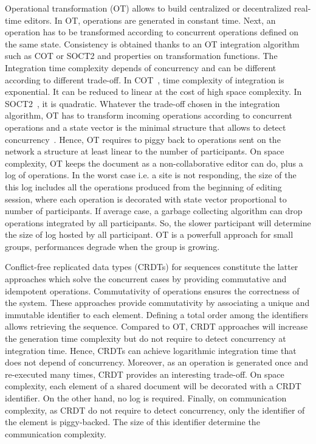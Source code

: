 \begin{asparadesc}
\item [Operational transformation (OT)] allows to build centralized or
  decentralized real-time editors. In OT, operations are generated in
  constant time. Next, an operation has to be transformed according to
  concurrent operations defined on the same state. Consistency is
  obtained thanks to an OT integration algorithm such as COT or SOCT2
  and properties on transformation functions. The Integration time
  complexity depends of concurrency and can be different according to
  different trade-off. In COT~\cite{sun2009contextbased}, time
  complexity of integration is exponential. It can be reduced to
  linear at the cost of high space complexity. In
  SOCT2~\cite{vidot2000copies}, it is quadratic. Whatever the trade-off chosen
  in the integration algorithm, OT has to transform incoming
  operations according to concurrent operations and a state vector is
  the minimal structure that allows to detect
  concurrency~\cite{charronbost1991concerning}. Hence, OT requires to
  piggy back to operations sent on the network a structure at least
  linear to the number of participants. On space complexity, OT keeps
  the document as a non-collaborative editor can do, plus a log of
  operations. In the worst case i.e. a site is not responding, the
  size of the this log includes all the operations produced from the
  beginning of editing session, where each operation is decorated with
  state vector proportional to number of participants. If average
  case, a garbage collecting algorithm can drop operations integrated
  by all participants. So, the slower participant will determine the
  size of log hosted by all participant. OT is a powerfull approach
  for small groups, performances degrade when the group is growing.

\item [Conflict-free replicated data types] (CRDTs) for sequences
  constitute the latter approaches which solve the concurrent cases by
  providing commutative and idempotent operations. Commutativity of
  operations ensures the correctness of the system. These approaches
  provide commutativity by associating a unique and immutable
  identifier to each element. Defining a total order among the
  identifiers allows retrieving the sequence. Compared to OT, CRDT
  approaches will increase the generation time complexity but do not
  require to detect concurrency at integration time. Hence, CRDTs can
  achieve logarithmic integration time that does not depend of
  concurrency. Moreover, as an operation is generated once and
  re-executed many times, CRDT provides an interesting trade-off. On
  space complexity, each element of a shared document will be
  decorated with a CRDT identifier. On the other hand, no log is
  required. Finally, on communication complexity, as CRDT do not require to
  detect concurrency, only the identifier of the element is
  piggy-backed. The size of this identifier determine the
  communication complexity.


\end{asparadesc}
